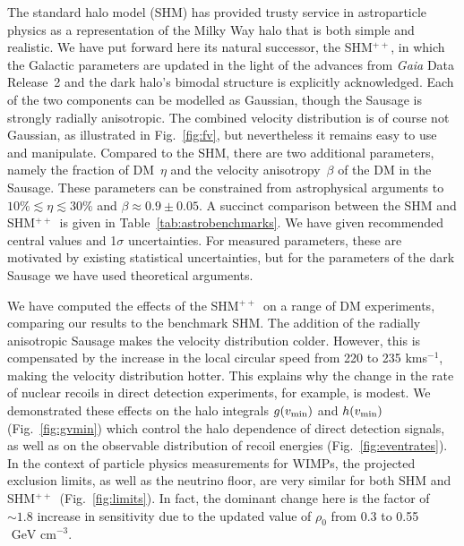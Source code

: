 \documentclass[prd,10pt,twocolumn,showpacs,nofootinbib, aps,superscriptaddress,preprintnumbers]{revtex4-1}
\newcommand{\vmin}{v_{\rm min}}
\newcommand{\GeVcm}{\textrm{ GeV cm}^{-3}}
\newcommand{\SHMpp}{SHM$^{++}$}
\begin{document}
The standard halo model (SHM) has provided trusty service in
astroparticle physics as a representation of the Milky Way halo that
is both simple and realistic.  We have put forward here its natural
successor, the \SHMpp, in which the Galactic parameters are updated in
the light of the advances from \emph{Gaia} Data Release~2 and the dark
halo's bimodal structure is explicitly acknowledged. Each of the two
components can be modelled as Gaussian, though the Sausage is strongly
radially anisotropic. The combined velocity distribution is of course
not Gaussian, as illustrated in Fig.~\ref{fig:fv}, but nevertheless
it remains easy to use and manipulate. Compared to the SHM, there are
two additional parameters, namely the fraction of DM~$\eta$ and the
velocity anisotropy~$\beta$ of the DM in the Sausage. These parameters
can be constrained from astrophysical arguments to $10\% \lesssim \eta
\lesssim 30 \% $ and $\beta \approx 0.9\pm 0.05$.  A succinct comparison
between the SHM and \SHMpp~is given in
Table~\ref{tab:astrobenchmarks}. We have given recommended central
values and 1$\sigma$ uncertainties. For measured parameters, these are
motivated by existing statistical uncertainties, but for the
parameters of the dark Sausage we have used theoretical arguments.

We have computed the effects of the \SHMpp~on a range of DM
experiments, comparing our results to the benchmark SHM. The addition
of the radially anisotropic Sausage makes the velocity distribution
colder. However, this is compensated by the increase in the local
circular speed from 220 to 235 kms$^{-1}$, making the velocity
distribution hotter. This explains why the change in the rate of
nuclear recoils in direct detection experiments, for example, is
modest. We demonstrated these effects on the halo integrals $g(\vmin)$
and $h(\vmin)$ (Fig.~\ref{fig:gvmin}) which control the halo
dependence of direct detection signals, as well as on the observable
distribution of recoil energies (Fig.~\ref{fig:eventrates}).  In the
context of particle physics measurements for WIMPs, the projected
exclusion limits, as well as the neutrino floor, are very similar for
both SHM and \SHMpp~(Fig.~\ref{fig:limits}). In fact, the dominant
change here is the factor of $\sim1.8$ increase in sensitivity due to
the updated value of $\rho_0$ from 0.3 to 0.55$\GeVcm$.
\end{document}
